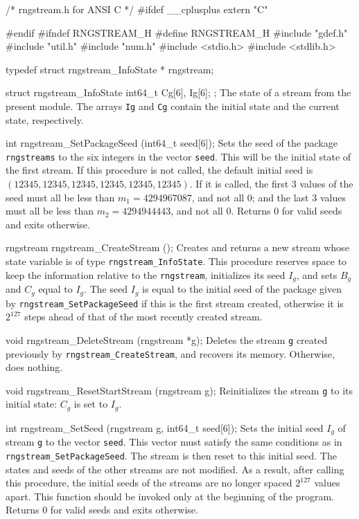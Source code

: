 \code\hide
/* rngstream.h for ANSI C */
#ifdef __cplusplus
extern "C" {
#endif
#ifndef RNGSTREAM_H
#define RNGSTREAM_H
\endhide
#include "gdef.h"
#include "util.h"
#include "num.h"
#include <stdio.h>
#include <stdlib.h>

typedef struct rngstream_InfoState * rngstream;

struct rngstream_InfoState {
   int64_t Cg[6], Ig[6];
};
\endcode
 \tab
   The state of a stream from the present module.
   The arrays {\tt Ig} and {\tt Cg} contain the initial state
   and the current state, respectively.
 \endtab
\code

int rngstream_SetPackageSeed (int64_t seed[6]);
\endcode
  \tab  Sets the seed of the package {\tt rngstreams} to the
   six integers in the vector {\tt seed}.
   This will be the initial state of the first stream.
   If this procedure is not called, the default initial seed
   is $(12345, 12345, 12345, 12345, 12345, 12345)$.
   If it is called, the first 3 values of the seed must all be
   less than $m_1 = 4294967087$, and not all 0;
   and the last 3 values
   must all be less than $m_2 = 4294944443$, and not all 0.
   Returns 0 for valid seeds and exits otherwise.
 \endtab
\code

rngstream rngstream_CreateStream ();
\endcode
 \tab Creates and returns a new stream
   whose state variable is of type {\tt rngstream\_InfoState}.
   This procedure reserves space to keep the information relative to
   the {\tt rngstream}, initializes its seed $I_g$,
   and sets $B_g$ and $C_g$ equal to $I_g$.
   The seed $I_g$ is equal to the initial seed of the package given by
   {\tt rngstream\_SetPackageSeed} if this is the first stream created,
   otherwise it is $2^{127}$ steps ahead of that of the most recently created stream.
 \endtab
\code

void rngstream_DeleteStream (rngstream *g);
\endcode
 \tab Deletes the stream {\tt *g} created previously
  by {\tt rngstream\_CreateStream}, and recovers its memory.
  Otherwise, does nothing.
 \endtab
\code

void rngstream_ResetStartStream (rngstream g);
\endcode
 \tab Reinitializes the stream {\tt g} to its initial state:
   $C_g$ is set to $I_g$.
 \endtab
\code

int rngstream_SetSeed (rngstream g, int64_t seed[6]);
\endcode
 \tab  Sets the initial seed $I_g$ of stream {\tt g}
  to the vector {\tt seed}.  This vector must satisfy the same
  conditions as in {\tt rngstream\_SetPackageSeed}.
  The stream is then reset to this initial seed.
  The states and seeds of the other streams are not modified.
  As a result, after calling this procedure, the initial seeds
  of the streams are no longer spaced $2^{127}$ values apart.
  This function should be invoked only at the beginning of the program.
  Returns 0 for valid seeds and exits otherwise.
 \endtab
\code

}
